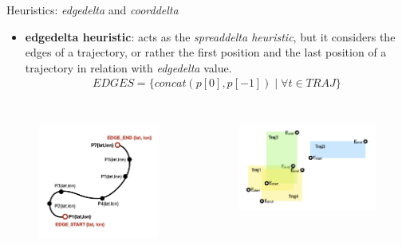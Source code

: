 \documentclass{beamer}
\begin{document}
\begin{frame}{Heuristics: \textit{edgedelta} and \textit{coorddelta}}
\begin{itemize}
	\item \textbf{edgedelta heuristic}: acts as the \textit{spreaddelta heuristic}, but it considers the edges of a trajectory, or rather the first position and the last position of a trajectory in relation with \textit{edgedelta} value. 
	\begin{align}
	EDGES = \{concat(p[0], p[-1]) \mid \forall t \in TRAJ \}
	\end{align}
\end{itemize}
\begin{columns}[t, onlytextwidth]
	\begin{figure}[bt]
		\centering
		\includegraphics[width=\textwidth]{edgedelta-calc}
		\label{fig:edgedelta-calc}
	\end{figure}
	\begin{figure}[bt]
		\centering
		\includegraphics[width=\textwidth]{edgedelta-pred}
		\label{fig:edgedelta-pred}
	\end{figure}
\end{columns}
\end{frame}
\end{document}
